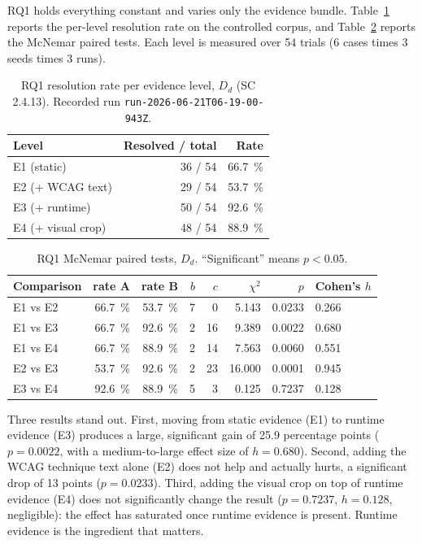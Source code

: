 \documentclass[11pt]{article}
\newcommand{\Dd}{\ensuremath{D_d}}
\begin{document}
RQ1 holds everything constant and varies only the evidence bundle.
Table~\ref{tab:rq2dd} reports the per-level resolution rate on the controlled corpus,
and Table~\ref{tab:mcdd} reports the McNemar paired tests. Each level is measured over
54 trials (6 cases times 3 seeds times 3 runs).

\begin{table}[h]
\centering
\caption{RQ1 resolution rate per evidence level, \Dd{} (SC 2.4.13). Recorded run
\texttt{run-2026-06-21T06-19-00-943Z}.}
\label{tab:rq2dd}
\begin{tabular}{lrr}
\toprule
Level & Resolved / total & Rate \\
\midrule
E1 (static) & 36 / 54 & \SI{66.7}{\percent} \\
E2 (+ WCAG text) & 29 / 54 & \SI{53.7}{\percent} \\
E3 (+ runtime) & 50 / 54 & \SI{92.6}{\percent} \\
E4 (+ visual crop) & 48 / 54 & \SI{88.9}{\percent} \\
\bottomrule
\end{tabular}
\end{table}

\begin{table}[h]
\centering
\caption{RQ1 McNemar paired tests, \Dd. ``Significant'' means $p < 0.05$.}
\label{tab:mcdd}
\begin{tabular}{lrrrrrrl}
\toprule
Comparison & rate A & rate B & $b$ & $c$ & $\chi^2$ & $p$ & Cohen's $h$ \\
\midrule
E1 vs E2 & \SI{66.7}{\percent} & \SI{53.7}{\percent} & 7 & 0 & 5.143 & 0.0233 & 0.266 \\
E1 vs E3 & \SI{66.7}{\percent} & \SI{92.6}{\percent} & 2 & 16 & 9.389 & 0.0022 & 0.680 \\
E1 vs E4 & \SI{66.7}{\percent} & \SI{88.9}{\percent} & 2 & 14 & 7.563 & 0.0060 & 0.551 \\
E2 vs E3 & \SI{53.7}{\percent} & \SI{92.6}{\percent} & 2 & 23 & 16.000 & 0.0001 & 0.945 \\
E3 vs E4 & \SI{92.6}{\percent} & \SI{88.9}{\percent} & 5 & 3 & 0.125 & 0.7237 & 0.128 \\
\bottomrule
\end{tabular}
\end{table}

Three results stand out. First, moving from static evidence (E1) to runtime evidence
(E3) produces a large, significant gain of 25.9 percentage points ($p = 0.0022$, with
a medium-to-large effect size of $h = 0.680$). Second, adding the WCAG technique text
alone (E2) does not help and actually hurts, a significant drop of 13 points ($p =
0.0233$). Third, adding the visual crop on top of runtime evidence (E4) does not
significantly change the result ($p = 0.7237$, $h = 0.128$, negligible): the effect
has saturated once runtime evidence is present. Runtime evidence is the ingredient
that matters.
\end{document}
